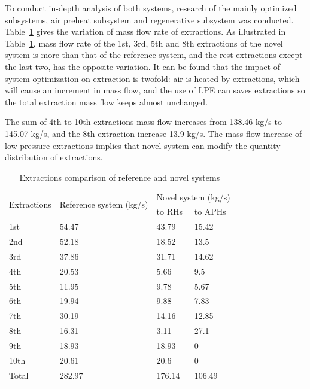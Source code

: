 \documentclass[preprint,12pt]{elsarticle}
\begin{document}

To conduct in-depth analysis of both systems, research of the mainly optimized subsystems, air preheat subsystem and regenerative subsystem was conducted.
Table~\ref{table:extraction_compare} gives the variation of mass flow rate of extractions.
As illustrated in Table~\ref{table:extraction_compare}, mass flow rate of the 1st, 3rd, 5th and 8th extractions of the novel system is more than that of the reference system, and the rest extractions except the last two, has the opposite variation. 
It can be found that the impact of system optimization on extraction is twofold: air is heated by extractions, which will cause an increment in mass flow, and the use of LPE can saves extractions so the total extraction mass flow keeps almost unchanged.

The sum of 4th to 10th extractions mass flow increases from 138.46 kg/s to 145.07 kg/s, and the 8th extraction increase 13.9 kg/s.
The mass flow increase of low pressure extractions implies that novel system can modify the quantity distribution of extractions.

\begin{table}
\caption{Extractions comparison of reference and novel systems}
\label{table:extraction_compare}
\begin{centering}
\begin{tabular}{llll}
\toprule 
\multirow{2}{*}{Extractions} & \multirow{2}{2.5cm}{Reference system (kg/s)} & \multicolumn{2}{c}{Novel system (kg/s)}\tabularnewline
\cmidrule{3-4} 
 &  & to RHs & to APHs\tabularnewline
\midrule
1st & 54.47 & 43.79 & 15.42\tabularnewline
2nd & 52.18 & 18.52 & 13.5\tabularnewline
3rd & 37.86 & 31.71 & 14.62\tabularnewline
4th & 20.53 & 5.66 & 9.5\tabularnewline
5th & 11.95 & 9.78 & 5.67\tabularnewline
6th & 19.94 & 9.88 & 7.83\tabularnewline
7th & 30.19 & 14.16 & 12.85\tabularnewline
8th & 16.31 & 3.11 & 27.1\tabularnewline
9th & 18.93 & 18.93 & 0\tabularnewline
10th & 20.61 & 20.6 & 0\tabularnewline
Total & 282.97 & 176.14 & 106.49\tabularnewline
\bottomrule
\end{tabular}
\par\end{centering}
\end{table}
\end{document}
